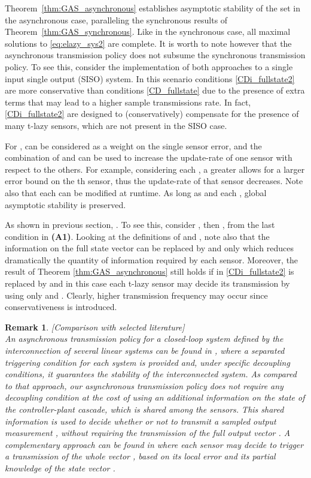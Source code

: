 \documentclass[twocolumn]{autart}
\newtheorem{remm}{Remark}
\newenvironment{remark}{\begin{remm}\rm }{\hfill \hspace*{1pt} \hfill \end{remm}}
\begin{document}
{
Theorem~\ref{thm:GAS_asynchronous} establishes asymptotic
stability of the set  in the asynchronous
case, paralleling the synchronous results of Theorem~\ref{thm:GAS_synchronous}.
Like in the synchronous case,
all maximal solutions to \eqref{eq:elazy_sys2} are complete.
It is worth to note
however that the asynchronous transmission policy does not subsume the 
synchronous transmission policy. To see this, consider the implementation
of both approaches to a single input single output (SISO) system. 
In this scenario conditions \eqref{CDi_fullstate2} 
are more conservative than conditions \eqref{CD_fullstate} due to the
presence of extra terms that may
lead to a higher sample transmissions rate. In fact, 
\eqref{CDi_fullstate2} are designed to (conservatively) compensate for the presence of 
many t-lazy sensors, which are not present in the SISO case.
}

For ,  can be considered as a weight on the 
single sensor error, and the combination of  and  
can be used to increase the update-rate 
of one sensor with respect to the others.
For example, considering each , 
a greater  allows for a larger error 
bound on the th sensor, thus the update-rate of that sensor 
decreases. 
Note also that each  can be modified at runtime. 
As long as  and each 
, global asymptotic stability is preserved. 

As shown in previous section, 
. To see this,
consider , then 
,
from the last condition in \textbf{(A1)}. 
Looking at the definitions of  and ,
note also that the information on the full state vector  
can be replaced by  and  only { which reduces 
dramatically the quantity of information required by each sensor}. 
Moreover, 
the result of Theorem \ref{thm:GAS_asynchronous}
still holds if  in \eqref{CDi_fullstate2} is 
replaced by  and in this case each t-lazy sensor
may decide its transmission by using only  and . 
Clearly, higher transmission frequency may occur 
since conservativeness is introduced.


\begin{remark}[{\emph{Comparison with selected literature}}] \\
An asynchronous transmission policy for a closed-loop system
defined by the interconnection of several linear systems can be found in \cite{Wang08b}, 
where a separated triggering condition for each system is provided and,
under specific decoupling conditions, it guarantees the stability of the 
interconnected system. 
{ 
As compared to that approach,
 our asynchronous transmission policy does not require any decoupling condition 
at the cost of using an additional information on the state of the 
controller-plant cascade, which is 
shared among the sensors.
This shared information is used to decide whether
or not to transmit a sampled output measurement , without requiring the
transmission of the full output vector .}
 A complementary approach can be found in \cite{Tabuada10} where
each sensor may decide to trigger a transmission of the whole vector , 
based on its local error  and its partial knowledge of the state vector .
\end{remark}
\end{document}

